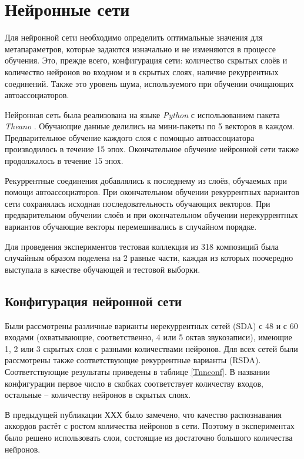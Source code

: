 \section{Нейронные сети} \label{sect3_nn}

Для нейронной сети необходимо определить оптимальные значения для
метапараметров, которые задаются изначально и не изменяются в процессе обучения.
Это, прежде всего, конфигурация сети: количество скрытых слоёв и количество
нейронов во входном и в скрытых слоях, наличие рекуррентных соединений. Также
это уровень шума, используемого при обучении очищающих автоассоциаторов.

Нейронная сеть была реализована на языке \emph{Python} с использованием пакета
\emph{Theano} \cite{Bergstra2010}. Обучающие данные делились на мини-пакеты по 5
векторов в каждом. Предварительное обучение каждого слоя с помощью
автоассоциатора производилось в течение 15 эпох. Окончательное обучение
нейронной сети также продолжалось в течение 15 эпох.

Рекуррентные соединения добавлялись к последнему из слоёв, обучаемых при помощи
автоассоциаторов. При окончательном обучении рекуррентных вариантов сети
сохранялась исходная последовательность обучающих векторов. При предварительном
обучении слоёв и при окончательном обучении нерекуррентных вариантов обучающие
векторы перемешивались в случайном порядке.

Для проведения экспериментов тестовая коллекция из 318 композиций была случайным
образом поделена на 2 равные части, каждая из которых поочередно выступала в
качестве обучающей и тестовой выборки.

\subsection{Конфигурация нейронной сети}

Были рассмотрены различные варианты нерекуррентных сетей (SDA) с 48 и с 60
входами (охватывающие, соответственно, 4 или 5 октав звукозаписи), имеющие 1, 2
или 3 скрытых слоя с разными количествами нейронов. Для всех сетей были
рассмотрены также соответствующие рекуррентные варианты (RSDA). Соответствующие
результаты приведены в таблице \ref{Tnnconf}. В названии конфигурации первое
число в скобках соответствует количеству входов, остальные -- количеству
нейронов в скрытых слоях.

В предыдущей публикации ХХХ было замечено, что качество распознавания аккордов
растёт с ростом количества нейронов в сети. Поэтому в экспериментах было решено
использовать слои, состоящие из достаточно большого количества нейронов.


